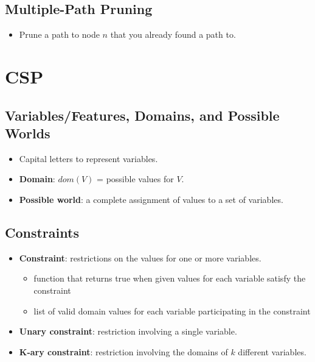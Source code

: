 \documentclass{article}
\begin{document}
\subsection{Multiple-Path Pruning}

\begin{itemize}
    \item Prune a path to node $n$ that you already found a path to.
\end{itemize}

\section{CSP}

\subsection{Variables/Features, Domains, and Possible Worlds}

\begin{itemize}
    \item Capital letters to represent variables.
    \item \textbf{Domain}: $dom(V)$ = possible values for $V$.
    \item \textbf{Possible world}: a complete assignment of values to a set of variables.
\end{itemize}

\subsection{Constraints}

\begin{itemize}
    \item \textbf{Constraint}: restrictions on the values for one or more variables.
        \begin{itemize}
            \item function that returns true when given values for each variable satisfy the constraint
            \item list of valid domain values for each variable participating in the constraint
        \end{itemize}
    \item \textbf{Unary constraint}: restriction involving a single variable.
    \item \textbf{K-ary constraint}: restriction involving the domains of $k$ different variables.
\end{itemize}
\end{document}
